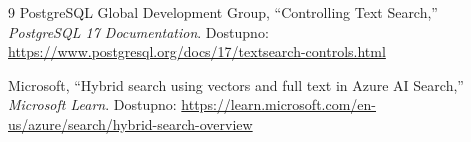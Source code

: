 \begin{thebibliography}{9}
    PostgreSQL Global Development Group, ``Controlling Text Search,'' \textit{PostgreSQL 17 Documentation}. Dostupno: \url{https://www.postgresql.org/docs/17/textsearch-controls.html}

    Microsoft, ``Hybrid search using vectors and full text in Azure AI Search,'' \textit{Microsoft Learn}. Dostupno: \url{https://learn.microsoft.com/en-us/azure/search/hybrid-search-overview}

\end{thebibliography}
